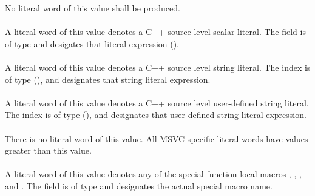 No literal word of this value shall be produced.

\paragraph{}
\label{sec:ifc:SourceLiteral:Scalar}

A literal word of this value denotes a C++ source-level scalar literal.  The  field
is of type  and desigates that literal expression ().


\paragraph{}
\label{sec:ifc:SourceLiteral:String}

A literal word of this value denotes a C++ source level string literal.  The  index
is of type  (), and designates that string literal expression.


\paragraph{}
\label{sec:ifc:SourceLiteral:DefinedString}

A literal word of this value denotes a C++ source level user-defined string literal.  The  index
is of type  (), and designates that 
user-defined string literal expression.

\paragraph{}  
\label{sec:ifc:SourceLiteral:Msvc}

There is no literal word of this value.  All MSVC-specific
literal words have values greater than this value.


\paragraph{}  
\label{sec:ifc:SourceLiteral:MsvcFunctionNameMacro}

A literal word of this value denotes any of the special function-local 
macros , , , and .
The  field is of type  and designates the actual special macro name.


